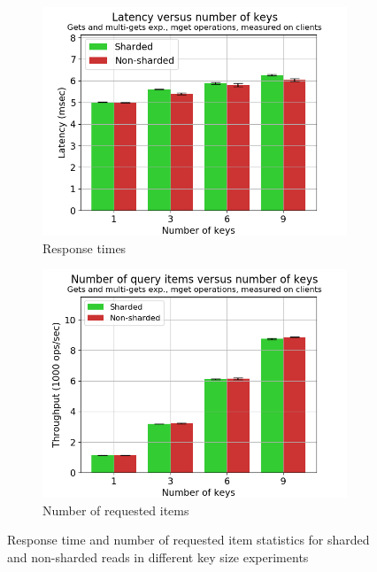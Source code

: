 \documentclass[11pt,a4paper]{article}
\begin{document}
\begin{figure}[h]
\begin{subfigure}{.5\textwidth}
  \centering
  \includegraphics[width=1.0\linewidth ,trim={5px 0px 20px 0px},clip]{img/plot/gmg-mget-lat_cli.png}
  \caption{Response times}
  \label{fig:gmg-mget-lat_cli}
\end{subfigure}%
\begin{subfigure}{.5\textwidth}
  \centering
  \includegraphics[width=1.0\linewidth ,trim={5px 0px 20px 0px},clip]{img/plot/gmg-mget-nitems_cli.png}
  \caption{Number of requested items}
  \label{fig:gmg-mget-nitems_cli}
\end{subfigure}
\caption{Response time and number of requested item statistics for sharded and non-sharded reads in different key size experiments}
\label{fig:gmg-mget_general}
\end{figure}
\end{document}
